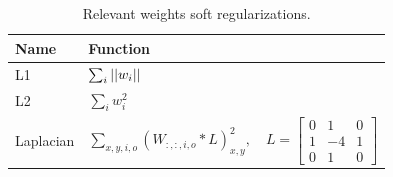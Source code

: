 \begin{table}[h]
    \renewcommand{\arraystretch}{1.2}
    \centering
    \begin{tabular}{|l|l|}
        \hline
        \textbf{Name} & \textbf{Function} \\ \hline
        L1 & $\sum_i \left|{|w_i|}\right|$ \\ \hline
        L2 & $\sum_i w_i^2$ \\ \hline
        Laplacian & $\sum_{x,y, i, o}(W_{:,:, i, o}*L)_{x,y}^2, \quad L=\left[\begin{smallmatrix}
0 & 1 & 0\\
1 & -4 & 1\\
0 & 1 & 0\end{smallmatrix}\right]$
 \\ \hline
    \end{tabular}
    \caption[Relevant weights soft regularizations.]{Relevant weights soft regularizations.}
    \label{tab:1.2}
    \renewcommand{\arraystretch}{1.0}
\end{table}
